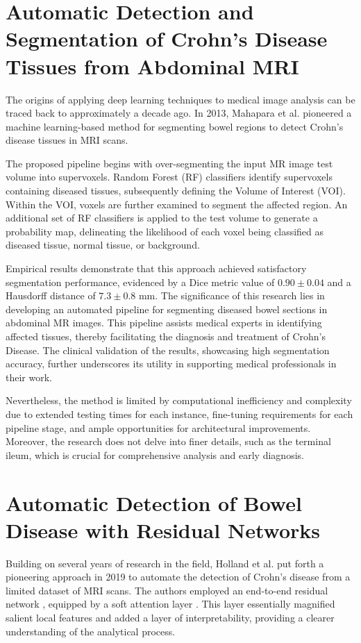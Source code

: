 \section{Automatic Detection and Segmentation of Crohn's Disease Tissues from Abdominal MRI}

The origins of applying deep learning techniques to medical image analysis can be traced back to approximately a decade ago. In 2013, Mahapara et al. \cite{mahapatra2013automatic} pioneered a machine learning-based method for segmenting bowel regions to detect Crohn's disease tissues in MRI scans.

The proposed pipeline begins with over-segmenting the input MR image test volume into supervoxels. Random Forest (RF) classifiers identify supervoxels containing diseased tissues, subsequently defining the Volume of Interest (VOI). Within the VOI, voxels are further examined to segment the affected region. An additional set of RF classifiers is applied to the test volume to generate a probability map, delineating the likelihood of each voxel being classified as diseased tissue, normal tissue, or background.

Empirical results demonstrate that this approach achieved satisfactory segmentation performance, evidenced by a Dice metric value of \(0.90 \pm 0.04\) and a Hausdorff distance of \(7.3 \pm 0.8\) mm. The significance of this research lies in developing an automated pipeline for segmenting diseased bowel sections in abdominal MR images. This pipeline assists medical experts in identifying affected tissues, thereby facilitating the diagnosis and treatment of Crohn's Disease. The clinical validation of the results, showcasing high segmentation accuracy, further underscores its utility in supporting medical professionals in their work.

Nevertheless, the method is limited by computational inefficiency and complexity due to extended testing times for each instance, fine-tuning requirements for each pipeline stage, and ample opportunities for architectural improvements. Moreover, the research does not delve into finer details, such as the terminal ileum, which is crucial for comprehensive analysis and early diagnosis.


\section{Automatic Detection of Bowel Disease with Residual Networks}

Building on several years of research in the field, Holland et al. \cite{holland2019automatic} put forth a pioneering approach in 2019 to automate the detection of Crohn's disease from a limited dataset of MRI scans. The authors employed an end-to-end residual network \cite{he2016deep}, equipped by a soft attention layer \cite{schlemper2019attention}. This layer essentially magnified salient local features and added a layer of interpretability, providing a clearer understanding of the analytical process.


